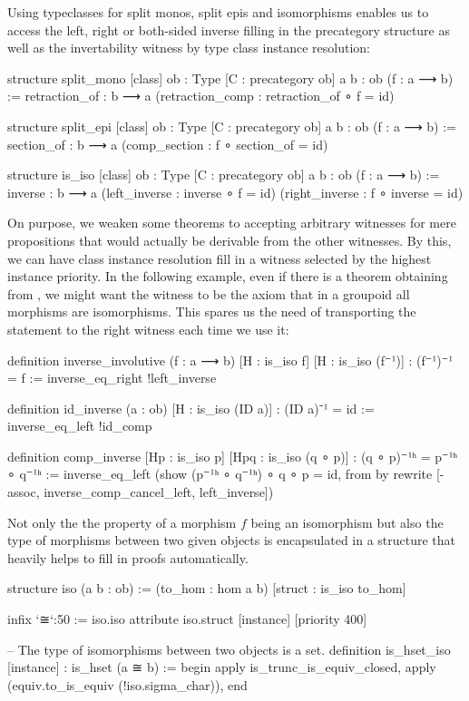 Using typeclasses for split monos, split epis and isomorphisms enables us to access
the left, right or both-sided inverse filling in the precategory structure as
well as the invertability witness by type class instance resolution:
\begin{leancode}
structure split_mono [class]
    {ob : Type} [C : precategory ob] {a b : ob} (f : a ⟶ b) :=
  {retraction_of : b ⟶ a}
  (retraction_comp : retraction_of ∘ f = id)

structure split_epi [class]
    {ob : Type} [C : precategory ob] {a b : ob} (f : a ⟶ b) :=
  {section_of : b ⟶ a}
  (comp_section : f ∘ section_of = id)

structure is_iso [class]
    {ob : Type} [C : precategory ob] {a b : ob} (f : a ⟶ b) :=
  {inverse : b ⟶ a}
  (left_inverse  : inverse ∘ f = id)
  (right_inverse : f ∘ inverse = id)
\end{leancode}

On purpose, we weaken some theorems to accepting arbitrary witnesses for mere propositions
that would actually be derivable from the other witnesses.
By this, we can have class instance resolution fill in a witness selected by the
highest instance priority.
In the following example, even if there is a theorem obtaining 
from , we might want the witness to be the axiom that in a groupoid
all morphisms are isomorphisms.
This spares us the need of transporting the statement to the right witness each
time we use it:
\begin{leancode}
definition inverse_involutive (f : a ⟶ b) [H : is_iso f] [H : is_iso (f⁻¹)]
  : (f⁻¹)⁻¹ = f :=
inverse_eq_right !left_inverse

definition id_inverse (a : ob) [H : is_iso (ID a)] : (ID a)⁻¹ = id :=
inverse_eq_left !id_comp

definition comp_inverse [Hp : is_iso p] [Hpq : is_iso (q ∘ p)] :
  (q ∘ p)⁻¹ʰ = p⁻¹ʰ ∘ q⁻¹ʰ :=
inverse_eq_left (show (p⁻¹ʰ ∘ q⁻¹ʰ) ∘ q ∘ p = id, from
  by rewrite [-assoc, inverse_comp_cancel_left, left_inverse])
\end{leancode}

Not only the the property of a morphism $f$ being an isomorphism but also the type
of morphisms between two given objects is encapsulated in a structure that heavily
helps to fill in proofs automatically. %
\begin{leancode}
structure iso (a b : ob) :=
  (to_hom : hom a b)
  [struct : is_iso to_hom]

infix `≅`:50 := iso.iso
attribute iso.struct [instance] [priority 400]

-- The type of isomorphisms between two objects is a set.
definition is_hset_iso [instance] : is_hset (a ≅ b) :=
begin
  apply is_trunc_is_equiv_closed,
    apply (equiv.to_is_equiv (!iso.sigma_char)),
end
\end{leancode}

